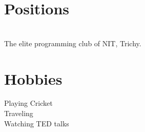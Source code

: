 \documentclass[]{deedy-resume-openfont}
\begin{document}
\begin{minipage}[t]{0.33\textwidth}
\section{Positions}
{}\\
The elite programming club of NIT, Trichy.
\sectionsep

\section{Hobbies}
\textbullet{} Playing Cricket \\
\textbullet{} Traveling \\
\textbullet{} Watching TED talks \\
\sectionsep

%
%

\end{minipage}
\hfill
\end{document}
